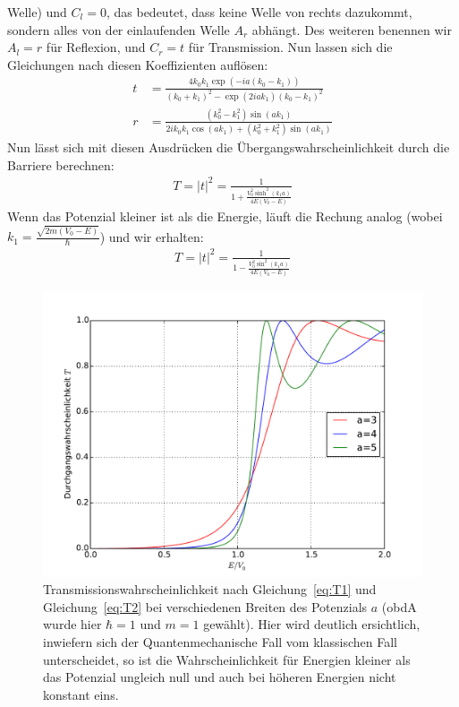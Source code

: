 Welle) und $C_l = 0$, das bedeutet, dass keine Welle von rechts dazukommt,
sondern alles von der einlaufenden Welle $A_r$ abhängt. Des weiteren
benennen wir $A_l=r$ für Reflexion, und $C_r=t$ für Transmission. Nun
lassen sich die Gleichungen nach diesen Koeffizienten auflösen:
\begin{align}
    t &= \frac{4k_0k_1\exp(-ia(k_0-k_1))}{(k_0+k_1)^2 - \exp(2iak_1)(k_0-k_1)^2}\\
    r &= \frac{(k_0^2 - k_1^2)\sin(ak_1)}{2ik_0k_1\cos(ak_1)+(k_0^2+k_1^2)\sin(ak_1)}
\end{align}
Nun lässt sich mit diesen Ausdrücken die Übergangswahrscheinlichkeit durch die 
Barriere berechnen:
\begin{align}
    T = \left | t \right |^2 = \frac{1}{1 + \frac{V_0^2 \sinh^2(k_1a)}{4E(V_0-E)}}
    \label{eq:T1}
\end{align}
Wenn das Potenzial kleiner ist als die Energie, läuft die Rechung analog
(wobei $k_1 = \frac{\sqrt{2m(V_0-E)}}{\hbar}$) und wir erhalten:
\begin{align}
    T = \left | t \right |^2 = \frac{1}{1 - \frac{V_0^2 \sin^2(k_1a)}{4E(V_0-E)}}
    \label{eq:T2}
\end{align}

\begin{figure}
\includegraphics[width=14cm]{pics/tunnel1}
\caption{Transmissionswahrscheinlichkeit nach Gleichung~\ref{eq:T1} und Gleichung~\ref{eq:T2}
bei verschiedenen Breiten des Potenzials $a$ (obdA wurde hier $\hbar=1$ und $m=1$ gewählt).
Hier wird deutlich ersichtlich, inwiefern sich der Quantenmechanische Fall vom klassischen
Fall unterscheidet, so ist die Wahrscheinlichkeit für Energien kleiner als das Potenzial ungleich
null und auch bei höheren Energien nicht konstant eins.} 
 \label{fig:tunnel1}
\end{figure}

